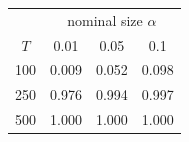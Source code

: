 % 
\begin{tabular}{cccc}
  \hline
  & \multicolumn{3}{c}{nominal size $\alpha$} \\
 $T$ & 0.01 & 0.05 & 0.1 \\
 \hline
100 & 0.009 & 0.052 & 0.098 \\ 
  250 & 0.976 & 0.994 & 0.997 \\ 
  500 & 1.000 & 1.000 & 1.000 \\ 
   \hline
\end{tabular}
